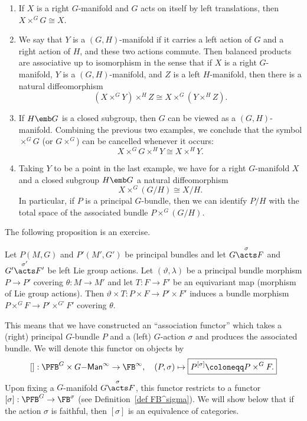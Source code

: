 \begin{example}
    \begin{enumerate}
        \item If $X$ is a right $G$-manifold and $G$ acts on itself by left translations, then $X\times^G G\cong X$.
        \item We say that $Y$ is a $(G,H)$-manifold if it carries a left action of $G$ and a right action of $H$, and these two actions commute. Then balanced products are associative up to isomorphism in the sense that if $X$ is a right $G$-manifold, $Y$ is a $(G,H)$-manifold, and $Z$ is a left $H$-manifold, then there is a natural diffeomorphism
        \[(X\times^G Y)\times^H Z\cong X\times^G (Y\times^H Z).\]
        \item If $H\emb G$ is a closed subgroup, then $G$ can be viewed as a $(G,H)$-manifold. Combining the previous two examples, we conclude that the symbol $\times^G G$ (or $G\times^G$) can be cancelled whenever it occurs:
        \[X\times^G G\times^H Y\cong X\times^H Y.\]
        \item Taking $Y$ to be a point in the last example, we have for a right $G$-manifold $X$ and a closed subgroup $H\emb G$ a natural diffeomorphism
        \[X\times^G (G\slash H)\cong X\slash H.\]
        In particular, if $P$ is a principal $G$-bundle, then we can identify $P\slash H$ with the total space of the associated bundle $P\times^G (G\slash H)$.
    \end{enumerate}
\end{example}

The following proposition is an exercise.
\begin{prop}[{{\cite[Prop.~1.2.2]{RS2}}}]\label{prop 1.2.2 RS2}
    Let $P(M,G)$ and $P'(M',G')$ be principal bundles and let $G\overset{\sigma}{\acts}F$ and $G'\overset{\sigma'}{\acts}F'$ be left Lie group actions. Let $(\vartheta,\lambda)$ be a principal bundle morphism $P\to P'$ covering $\theta:M\to M'$ and let $T:F\to F'$ be an equivariant map (morphism of Lie group actions). Then $\vartheta\times T:P\times F\to P'\times F'$ induces a bundle morphism $P\times^G F\to P'\times^{G'} F'$ covering $\theta$.
\end{prop}

This means that we have constructed an ``association functor'' which takes a (right) principal $G$-bundle $P$ and a (left) $G$-action $\sigma$ and produces the associated bundle. We will denote this functor on objects by
\[[]:\PFB^G\times G\mathsf{-Man}^\infty \to \FB^\infty,\quad (P,\sigma)\mapsto \boxed{P^{[\sigma]}\coloneqq P\times^G F.}\]
Upon fixing a $G$-manifold $G\overset{\sigma}{\acts}F$, this functor restricts to a functor
$[\sigma]:\PFB^G\to \FB^\sigma$ (see Definition~\ref{def FB^sigma}). We will show below that if the action $\sigma$ is faithful, then $[\sigma]$ is an equivalence of categories.

